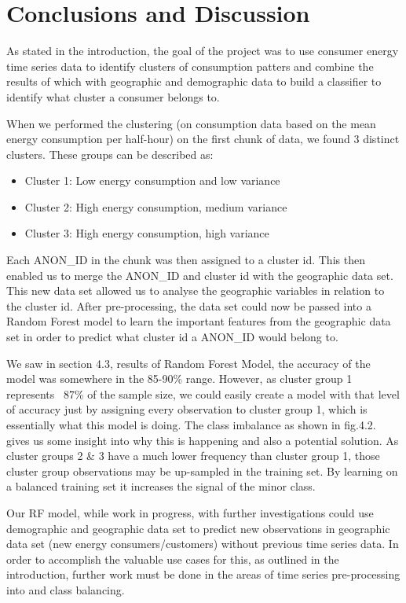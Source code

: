 \chapter{Conclusions and Discussion}
As stated in the introduction, the goal of the project was to use consumer energy time series data to identify clusters of consumption patters and combine the results of which with geographic and demographic data to build a classifier to identify what cluster a consumer belongs to.

When we performed the clustering (on consumption data based on the mean energy consumption per half-hour) on the first chunk of data, we found 3 distinct clusters. These groups can be described as:
    \begin{itemize}
        \item Cluster 1: Low energy consumption and low variance
        \item Cluster 2: High energy consumption, medium variance
        \item Cluster 3: High energy consumption, high variance
    \end{itemize}
    
Each ANON\_ID in the chunk was then assigned to a cluster id. This then enabled us to merge the ANON\_ID and cluster id with the geographic data set. This new data set allowed us to analyse the geographic variables in relation to the cluster id. After pre-processing, the data set could now be passed into a Random Forest model to learn the important features from the geographic data set in order to predict what cluster id a ANON\_ID would belong to.

We saw in section 4.3, results of Random Forest Model, the accuracy of the model was somewhere in the 85-90\% range. However, as cluster group 1 represents ~87\% of the sample size, we could easily create a model with that level of accuracy just by assigning every observation to cluster group 1, which is essentially what this model is doing. The class imbalance as shown in fig.4.2. gives us some insight into why this is happening and also a potential solution. As cluster groups 2 \& 3 have a much lower frequency than cluster group 1, those cluster group observations may be up-sampled in the training set. By learning on a balanced training set it increases the signal of the minor class.


Our RF model, while work in progress, with further investigations could use demographic and geographic data set to predict new observations in geographic data set (new energy consumers/customers) without previous time series data. In order to accomplish the valuable use cases for this, as outlined in the introduction, further work must be done in the areas of time series pre-processing into and class balancing.

